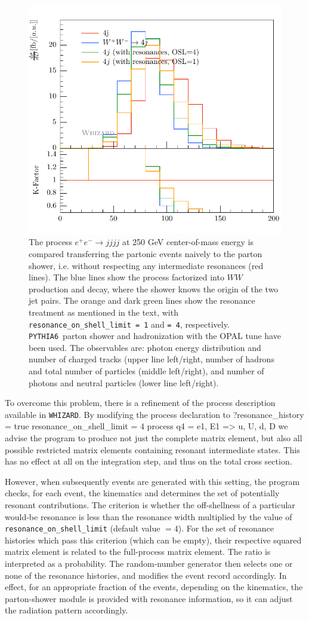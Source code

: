 \documentclass[12pt]{book}
\newenvironment{Code}%
  {\begingroup\footnotesize
   \quote
   \Verbatim[frame=single]}%
  {\endVerbatim
   \endquote
   \endgroup\noindent}
\newcommand{\ttt}[1]{\texttt{#1}}
\newcommand{\whizard}{\ttt{WHIZARD}}
\newcommand{\pythiasix}{\ttt{PYTHIA6}}
\begin{document}
\begin{figure}
\begin{center}
    \includegraphics[width=.41\textwidth]{resonance_n_visible}
  \end{center}
  \caption{The process $e^+e^- \to jjjj$ at 250 GeV center-of-mass
    energy is compared transferring the partonic events naively to the
    parton shower, i.e. without respecting any intermediate resonances
    (red lines). The blue lines show the process factorized into $WW$
    production and decay, where the shower knows the origin of the two
    jet pairs. The orange and dark green lines show the resonance
    treatment as mentioned in the text, with
    \ttt{resonance\_on\_shell\_limit = 1} and \ttt{= 4},
    respectively. \pythiasix\ parton shower and hadronization with the
    OPAL tune have been used. The observables are: photon energy
    distribution and number of charged tracks (upper line left/right,
    number of hadrons and total number of particles (middle
    left/right), and number of photons and neutral particles (lower
    line left/right).}
\end{figure}

To overcome this problem, there is a refinement of the process description
available in \whizard.  By modifying the process declaration to
\begin{Code}
  ?resonance_history = true
  resonance_on_shell_limit = 4
  process q4 = e1, E1 => u, U, d, D
\end{Code}
we advise the program to produce not just the complete matrix element, but
also all possible restricted matrix elements containing resonant intermediate
states.  This has no effect at all on the integration step, and thus on the
total cross section.

However, when subsequently events are generated with this setting, the program
checks, for each event, the kinematics and determines the set of potentially
resonant contributions.  The criterion is whether the off-shellness of a
particular would-be resonance is less than the resonance width multiplied by
the value of \verb|resonance_on_shell_limit| (default value $=4$).  For the
set of resonance histories which pass this criterion (which can be empty),
their respective squared matrix element is related to the full-process matrix
element.  The ratio is interpreted as a probability.  The random-number
generator then selects one or none of the resonance histories, and modifies
the event record accordingly.  In effect, for an appropriate fraction of the
events, depending on the kinematics, the parton-shower module is provided with
resonance information, so it can adjust the radiation pattern accordingly.
\end{document}
